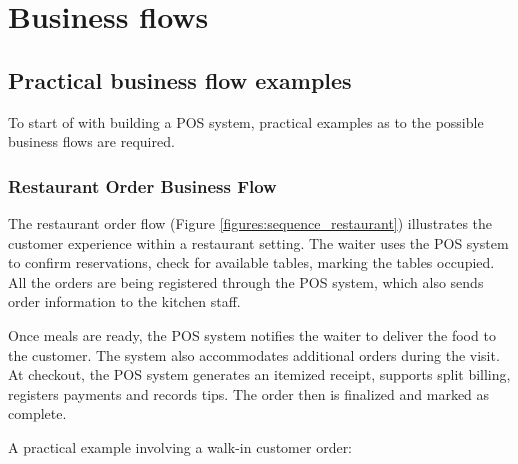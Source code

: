 \documentclass[11pt,a4paper,pdftex]{article}
\begin{document}
\section{Business flows}
\subsection{Practical business flow examples}
To start of with building a POS system, practical examples as to the possible business flows are required.

\subsubsection{Restaurant Order Business Flow}
The restaurant order flow (Figure \ref{figures:sequence_restaurant}) illustrates the customer experience within a restaurant setting. The waiter uses the POS system to confirm reservations, check for available tables, marking the tables occupied. All the orders are being registered through the POS system, which also sends order information to the kitchen staff.

Once meals are ready, the POS system notifies the waiter to deliver the food to the customer. The system also accommodates additional orders during the visit. At checkout, the POS system generates an itemized receipt, supports split billing, registers payments and records tips. The order then is finalized and marked as complete. 

A practical example involving a walk-in customer order:
\end{document}
